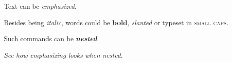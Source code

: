 \documentclass{article}
\begin{document}
Text can be \emph{emphasized}.

Besides being \textit{italic}, words could be \textbf{bold}, \textsl{slanted}
or typeset in \textsc{small caps}.

Such commands can be \textit{\textbf{nested}}.

\emph{See how \emph{emphasizing} looks when nested}.
\end{document}
